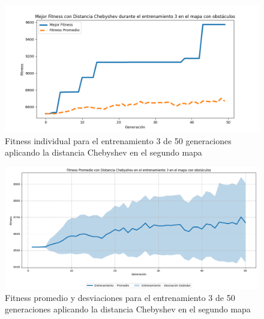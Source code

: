 \documentclass[conference]{IEEEtran}
\begin{document}
\begin{figure}[H]
    \centering
    \includegraphics[width=0.9 \linewidth]{Chebyshev/Mapa2/Fitness_3_Map2_Cheby_50Gen.png}
    \caption{Fitness individual para el entrenamiento 3 de 50 generaciones aplicando la distancia Chebyshev en el segundo mapa}
    \label{fig:cheb_3_50_m2}
\end{figure}
\begin{figure}[H]
    \centering
    \includegraphics[width=0.9 \linewidth]{Chebyshev/Mapa2/Fitness_3_Map2_Cheby_50Gen_Sombra.png}
    \caption{Fitness promedio y desviaciones para el entrenamiento 3 de 50 generaciones aplicando la distancia Chebyshev en el segundo mapa}
    \label{fig:cheb_3_50_sombra_m2}
\end{figure}
\end{document}
